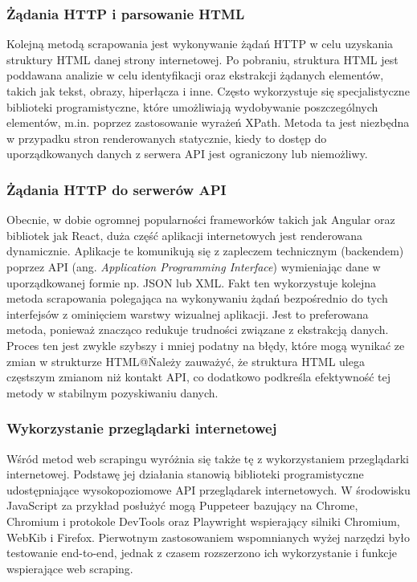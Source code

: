 \subsubsection{Żądania HTTP i parsowanie HTML}

Kolejną metodą scrapowania jest wykonywanie żądań HTTP w celu uzyskania struktury HTML danej strony internetowej.
Po pobraniu, struktura HTML jest poddawana analizie w celu identyfikacji oraz ekstrakcji żądanych elementów, takich jak tekst, obrazy, hiperłącza i inne.
Często wykorzystuje się specjalistyczne biblioteki programistyczne, które umożliwiają wydobywanie poszczególnych elementów, m.in. poprzez zastosowanie wyrażeń XPath.
Metoda ta jest niezbędna w przypadku stron renderowanych statycznie, kiedy to dostęp do uporządkowanych danych z serwera API jest ograniczony lub niemożliwy.

\subsubsection{Żądania HTTP do serwerów API}

Obecnie, w dobie ogromnej popularności frameworków takich jak Angular oraz bibliotek jak React, duża część aplikacji internetowych jest renderowana dynamicznie.
Aplikacje te komunikują się z zapleczem technicznym (backendem) poprzez API (ang. \emph{Application Programming Interface}) wymieniając dane w uporządkowanej formie np. JSON lub XML.
Fakt ten wykorzystuje kolejna metoda scrapowania polegająca na wykonywaniu żądań bezpośrednio do tych interfejsów z ominięciem warstwy wizualnej aplikacji.
Jest to preferowana metoda, ponieważ znacząco redukuje trudności związane z ekstrakcją danych.
Proces ten jest zwykle szybszy i mniej podatny na błędy, które mogą wynikać ze zmian w strukturze HTML@\.
Należy zauważyć, że struktura HTML ulega częstszym zmianom niż kontakt API, co dodatkowo podkreśla efektywność tej metody w stabilnym pozyskiwaniu danych.

\subsubsection{Wykorzystanie przeglądarki internetowej}\label{subsubsec:browser-scraping-theory}

Wśród metod web scrapingu wyróżnia się także tę z wykorzystaniem przeglądarki internetowej.
Podstawę jej działania stanowią biblioteki programistyczne udostępniające wysokopoziomowe API przeglądarek internetowych.
W środowisku JavaScript za przykład posłużyć mogą Puppeteer bazujący na Chrome, Chromium i protokole DevTools
oraz Playwright wspierający silniki Chromium, WebKib i Firefox.
Pierwotnym zastosowaniem wspomnianych wyżej narzędzi było testowanie end-to-end, jednak z czasem rozszerzono ich wykorzystanie i funkcje wspierające web scraping.

